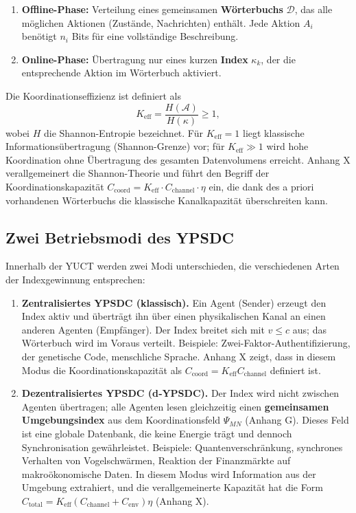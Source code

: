 \documentclass[12pt,a4paper]{article}
\begin{document}
	\begin{enumerate}
		\item \textbf{Offline-Phase:} Verteilung eines gemeinsamen \textbf{Wörterbuchs} \(\mathcal{D}\), das alle möglichen Aktionen (Zustände, Nachrichten) enthält. Jede Aktion \(A_i\) benötigt \(n_i\) Bits für eine vollständige Beschreibung.
		\item \textbf{Online-Phase:} Übertragung nur eines kurzen \textbf{Index} \(\kappa_k\), der die entsprechende Aktion im Wörterbuch aktiviert.
	\end{enumerate}
	
	Die Koordinationseffizienz ist definiert als
	\[
	K_{\mathrm{eff}} = \frac{H(\mathcal{A})}{H(\kappa)} \ge 1,
	\]
	wobei \(H\) die Shannon-Entropie bezeichnet. Für \(K_{\mathrm{eff}} = 1\) liegt klassische Informationsübertragung (Shannon-Grenze) vor; für \(K_{\mathrm{eff}} \gg 1\) wird hohe Koordination ohne Übertragung des gesamten Datenvolumens erreicht. Anhang X verallgemeinert die Shannon-Theorie und führt den Begriff der Koordinationskapazität \(C_{\text{coord}} = K_{\mathrm{eff}} \cdot C_{\text{channel}} \cdot \eta\) ein, die dank des a priori vorhandenen Wörterbuchs die klassische Kanalkapazität überschreiten kann.
	
	\subsection{Zwei Betriebsmodi des YPSDC}
	
	Innerhalb der YUCT werden zwei Modi unterschieden, die verschiedenen Arten der Indexgewinnung entsprechen:
	
	\begin{enumerate}
		\item \textbf{Zentralisiertes YPSDC (klassisch).} Ein Agent (Sender) erzeugt den Index aktiv und überträgt ihn über einen physikalischen Kanal an einen anderen Agenten (Empfänger). Der Index breitet sich mit \(v \le c\) aus; das Wörterbuch wird im Voraus verteilt. Beispiele: Zwei-Faktor-Authentifizierung, der genetische Code, menschliche Sprache. Anhang X zeigt, dass in diesem Modus die Koordinationskapazität als \(C_{\text{coord}} = K_{\mathrm{eff}} C_{\text{channel}}\) definiert ist.
		
		\item \textbf{Dezentralisiertes YPSDC (d‑YPSDC).} Der Index wird nicht zwischen Agenten übertragen; alle Agenten lesen gleichzeitig einen \textbf{gemeinsamen Umgebungsindex} aus dem Koordinationsfeld \(\Psi_{MN}\) (Anhang G). Dieses Feld ist eine globale Datenbank, die keine Energie trägt und dennoch Synchronisation gewährleistet. Beispiele: Quantenverschränkung, synchrones Verhalten von Vogelschwärmen, Reaktion der Finanzmärkte auf makroökonomische Daten. In diesem Modus wird Information aus der Umgebung extrahiert, und die verallgemeinerte Kapazität hat die Form \(C_{\text{total}} = K_{\mathrm{eff}}(C_{\text{channel}} + C_{\text{env}})\eta\) (Anhang X).
	\end{enumerate}
	
\end{document}
